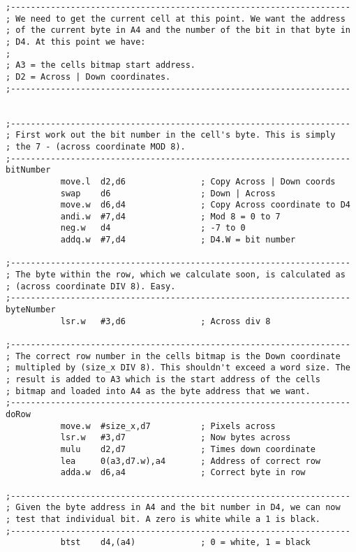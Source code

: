 \begin{lstlisting}[firstnumber=last,caption={Langtons Ant - Pixel Calculations}]
;--------------------------------------------------------------------
; We need to get the current cell at this point. We want the address
; of the current byte in A4 and the number of the bit in that byte in
; D4. At this point we have:
;
; A3 = the cells bitmap start address.
; D2 = Across | Down coordinates.
;--------------------------------------------------------------------


;--------------------------------------------------------------------
; First work out the bit number in the cell's byte. This is simply
; the 7 - (across coordinate MOD 8).
;--------------------------------------------------------------------
bitNumber
           move.l  d2,d6               ; Copy Across | Down coords
           swap    d6                  ; Down | Across
           move.w  d6,d4               ; Copy Across coordinate to D4
           andi.w  #7,d4               ; Mod 8 = 0 to 7
           neg.w   d4                  ; -7 to 0
           addq.w  #7,d4               ; D4.W = bit number

;--------------------------------------------------------------------
; The byte within the row, which we calculate soon, is calculated as
; (across coordinate DIV 8). Easy.
;--------------------------------------------------------------------
byteNumber
           lsr.w   #3,d6               ; Across div 8

;--------------------------------------------------------------------
; The correct row number in the cells bitmap is the Down coordinate
; multipled by (size_x DIV 8). This shouldn't exceed a word size. The
; result is added to A3 which is the start address of the cells
; bitmap and loaded into A4 as the byte address that we want.
;--------------------------------------------------------------------
doRow
           move.w  #size_x,d7          ; Pixels across
           lsr.w   #3,d7               ; Now bytes across
           mulu    d2,d7               ; Times down coordinate
           lea     0(a3,d7.w),a4       ; Address of correct row
           adda.w  d6,a4               ; Correct byte in row

;--------------------------------------------------------------------
; Given the byte address in A4 and the bit number in D4, we can now
; test that individual bit. A zero is white while a 1 is black.
;--------------------------------------------------------------------
           btst    d4,(a4)             ; 0 = white, 1 = black

\end{lstlisting}

